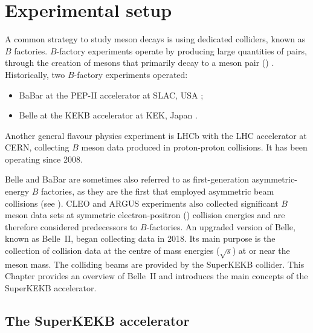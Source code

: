 \chapter{Experimental setup}\label{ch:belle2}

A common strategy to study \B meson decays is using dedicated colliders, known as $B$ factories.
$B$-factory experiments operate by producing large quantities of \BB pairs, through the creation of \FourS mesons that primarily decay to a \B meson pair (\BB) \cite{Workman:2022ynf}.
Historically, two $B$-factory experiments operated:
\begin{itemize}
    \item BaBar at the PEP-II accelerator at SLAC, USA \cite{BaBar:1995bns};
    \item Belle at the KEKB accelerator at KEK, Japan \cite{Belle:2000cnh}.
\end{itemize}
Another general flavour physics experiment is LHCb \cite{LHCb:2008vvz} with the LHC accelerator at CERN, 
collecting $B$ meson data produced in proton-proton collisions.
It has been operating since 2008.

Belle and BaBar are sometimes also referred to as first-generation asymmetric-energy $B$ factories, as they are the first that employed asymmetric beam collisions (see ).
CLEO \cite{CLEO:1982pvq} and ARGUS \cite{ARGUS:1988bds} experiments also collected significant $B$ meson data sets at symmetric electron-positron (\epem) collision energies and are therefore considered predecessors to $B$-factories. 
An upgraded version of Belle, known as Belle~II, began collecting data in 2018.
Its main purpose is the collection of \epem collision data 
at the centre of mass energies ($\sqrt{s}$) at or near the \FourS meson mass.
The colliding beams are provided by the SuperKEKB collider.
This Chapter provides an overview of Belle~II and introduces the main concepts of the SuperKEKB accelerator.

\section{The SuperKEKB accelerator}\label{sec:superkekb}

